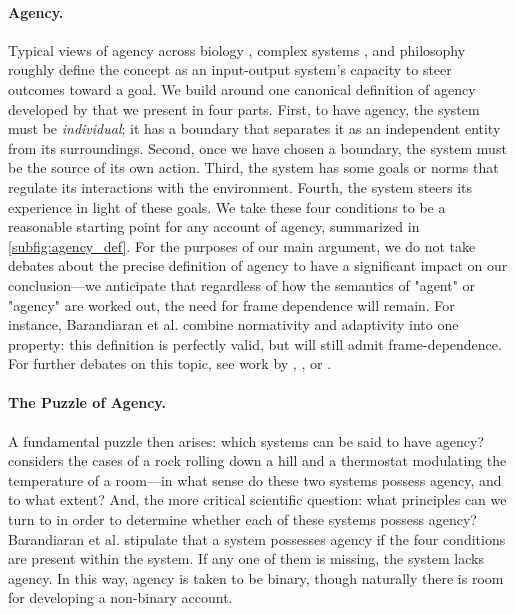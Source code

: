 \documentclass[11pt]{article} %
\begin{document}
\paragraph{Agency.} Typical views of agency across biology \citep{ball2023organisms}, complex systems \citep{moreno2005agency,moreno2018minimal}, and philosophy \citep{dretske1999machines,barandiaran2009defining} roughly define the concept as an input-output system's capacity to steer outcomes toward a goal. 
%
We build around one canonical definition of agency developed by \cite{barandiaran2009defining} that we present in four parts. %
%
First, to have agency, the system must be \textit{individual}; it has a boundary that separates it as an independent entity from its surroundings. %
%
Second, once we have chosen a boundary, the system must be the source of its own action. 
%
Third, the system has some goals or norms that regulate its interactions with the environment. 
%
Fourth, the system steers its experience in light of these goals. 
%
%
We take these four conditions to be a reasonable starting point for any account of agency, summarized in \cref{subfig:agency_def}. %
For the purposes of our main argument, we do not take debates about the precise definition of agency to have a significant impact on our conclusion---we anticipate that regardless of how the semantics of "agent" or "agency" are worked out, the need for frame dependence will remain. For instance, Barandiaran et al. combine normativity and adaptivity into one property: this definition is perfectly valid, but will still admit frame-dependence. For further debates on this topic, see work by \cite{moreno2018minimal}, \cite{ball2023organisms}, or \cite{dretske1999machines}.


%
\paragraph{The Puzzle of Agency.} A fundamental puzzle then arises: which systems can be said to have agency? \cite{dennett1989intentional} considers the cases of a rock rolling down a hill and a thermostat modulating the temperature of a room---in what sense do these two systems possess agency, and to what extent? And, the more critical scientific question: what principles can we turn to in order to determine whether each of these systems possess agency? Barandiaran et al. stipulate that a system possesses agency if the four conditions are present within the system. If any one of them is missing, the system lacks agency. In this way, agency is taken to be binary, though naturally there is room for developing a non-binary account. 
\end{document}

